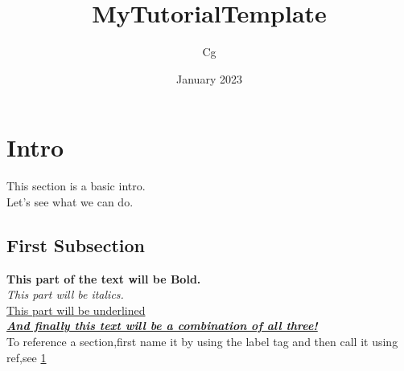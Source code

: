 \documentclass{article}
\title{MyTutorialTemplate}
\author{Cg}
\date{January 2023}
\begin{document}
\maketitle
\section{Intro}\label{sec:intro}
This section is a basic intro.\\
Let's see what we can do.
\subsection{First Subsection}
\textbf{This part of the text will be Bold.}\\
\textit{This part will be italics.\\}
\underline{This part will be underlined}\\
\textbf{\textit{\underline{And finally this text will be a combination of all three!}}}\\
To reference a section,first name it by using the label tag and then call it using ref,see \ref{sec:intro}
\end{document}
